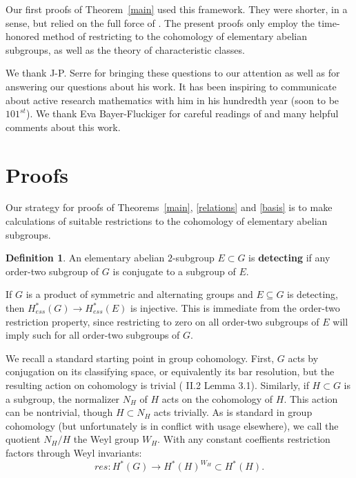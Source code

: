 \documentclass{article}
\theoremstyle{plain}
\theoremstyle{definition}
\newtheorem{definition}[theorem]{Definition}
\begin{document}
Our
first proofs of Theorem~\ref{main} used this framework.
They were shorter, in a sense, but relied on the full force of \cite{GSS12, GiSi21}.
The present proofs only employ the
time-honored method of restricting to the cohomology
of elementary abelian subgroups,
as well as the theory of characteristic classes.  



We thank J-P. Serre for bringing these questions to our attention as well as 
for answering our questions about his work.  It has
been inspiring to communicate about active research mathematics
with him in his hundredth year (soon to be $101^{st}$).
We thank Eva Bayer-Fluckiger for careful readings of and many helpful comments 
about this work.


\section{Proofs}




Our strategy for proofs of Theorems~\ref{main}, \ref{relations} and
\ref{basis} is to make calculations of suitable
restrictions to the cohomology of elementary abelian
subgroups.  

\begin{definition}
An elementary abelian $2$-subgroup $E \subset G$ is
{\bf detecting} if any order-two subgroup of $G$ is conjugate
to a subgroup of $E$.  
\end{definition}

If $G$ is a product of symmetric and alternating groups
and $E \subseteq G$ is detecting, then $H^*_{ess}(G ) \to H^*_{ess}(E )$ is injective.
This is immediate from the order-two restriction property, since restricting to zero on all
order-two subgroups of $E$ will imply such for all
order-two subgroups of $G$.


We recall a standard starting point in group cohomology.
First, $G$  acts by conjugation on its classifying space, or equivalently its bar resolution, 
but the resulting action on cohomology
is trivial (\cite{AdMi94} II.2 Lemma 3.1).  Similarly, if $H \subset G$ is a subgroup, 
the normalizer $N_H$ of $H$  acts on the cohomology of
$H$.  This action can be nontrivial, though $H \subset N_H$
 acts trivially.  As is standard in group cohomology (but 
unfortunately is in conflict with usage elsewhere), 
we call the quotient
$N_H / H$ the Weyl group $W_H$. With any constant coeffients
restriction factors through Weyl invariants:
$$res: H^*(G) \to H^*(H)^{W_H} \subset H^*(H).$$
\end{document}
